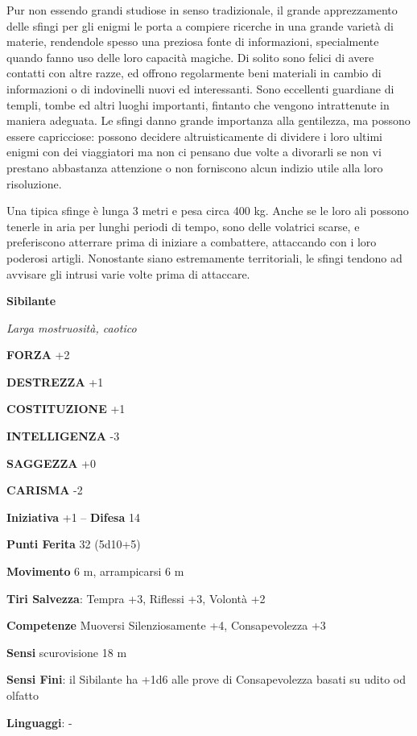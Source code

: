 \begin{multicols}{2}
Pur non essendo grandi studiose in senso tradizionale, il grande apprezzamento delle sfingi per gli enigmi le porta a compiere ricerche in una grande varietà di materie, rendendole spesso una preziosa fonte di informazioni, specialmente quando fanno uso delle loro capacità magiche. Di solito sono felici di avere contatti con altre razze, ed offrono regolarmente beni materiali in cambio di informazioni o di indovinelli nuovi ed interessanti. Sono eccellenti guardiane di templi, tombe ed altri luoghi importanti, fintanto che vengono intrattenute in maniera adeguata. Le sfingi danno grande importanza alla gentilezza, ma possono essere capricciose: possono decidere altruisticamente di dividere i loro ultimi enigmi con dei viaggiatori ma non ci pensano due volte a divorarli se non vi prestano abbastanza attenzione o non forniscono alcun indizio utile alla loro risoluzione.

Una tipica sfinge è lunga 3 metri e pesa circa 400 kg. Anche se le loro ali possono tenerle in aria per lunghi periodi di tempo, sono delle volatrici scarse, e preferiscono atterrare prima di iniziare a combattere, attaccando con i loro poderosi artigli. Nonostante siano estremamente territoriali, le sfingi tendono ad avvisare gli intrusi varie volte prima di attaccare.

\medskip{}\textbf{Sibilante}

\textit{Larga mostruosità, caotico}

\textbf{FORZA} +2

\textbf{DESTREZZA} +1

\textbf{COSTITUZIONE} +1

\textbf{INTELLIGENZA} -3

\textbf{SAGGEZZA} +0

\textbf{CARISMA} -2

\textbf{Iniziativa} +1 -- \textbf{Difesa} 14

\textbf{Punti Ferita} 32 (5d10+5)

\textbf{Movimento} 6 m, arrampicarsi 6 m

\textbf{Tiri Salvezza}: Tempra +3, Riflessi +3, Volontà +2

\textbf{Competenze} Muoversi Silenziosamente +4, Consapevolezza +3

\textbf{Sensi} scurovisione 18 m

\textbf{Sensi Fini}: il Sibilante ha +1d6 alle prove di Consapevolezza basati su udito od olfatto

\textbf{Linguaggi}: -


\end{multicols}
